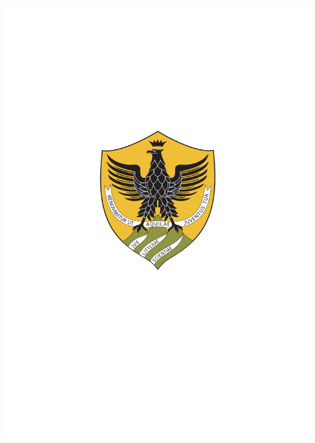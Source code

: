 \documentclass[
11pt, %
english, %
singlespacing, %
headsepline, %
]{MastersDoctoralThesis} %
\author{Mudita \textsc{Shakya}} %
\begin{document}
\frontmatter %

\pagestyle{plain} %


\begin{titlepage}
\begin{center}
\vspace*{.06\textheight}
\includegraphics[width=0.2\linewidth]{Figures/logos/univaq.pdf}


\end{center}
\end{titlepage}
\end{document}
